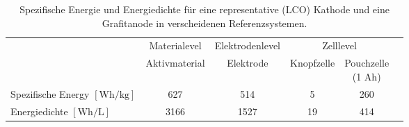 \begin{table}[ht]
    \centering
    \caption{\label{tab:energy_densities}Spezifische Energie und Energiedichte für eine representative  (LCO) Kathode und eine Grafitanode in verscheidenen Referenzsystemen.\cite{Son2021}}
    \begin{tabular}[t]{lccccc}
    \toprule
    \multirow{2}{*}{}
    &\multirow{1}{*}{Materialevel} %
    &\multirow{1}{*}{Elektrodenlevel}
    &\multicolumn{2}{c}{Zelllevel}
    \\ \cmidrule{2-5}
    &Aktivmaterial
    &Elektrode
    &Knopfzelle
    &\makecell{Pouchzelle\\(1 Ah)}
    \\
    \midrule
    \makecell{Spezifische Energy\\ $\left[ \si{\watt \hour \per \kg} \right]$} & 627 & 514 & 5 & 260\\
    \makecell{Energiedichte\\ $\left[ \si{\watt \hour \per \liter} \right]$} & 3166 & 1527 & 19 & 414\\
    \bottomrule
    \end{tabular}
\end{table}%